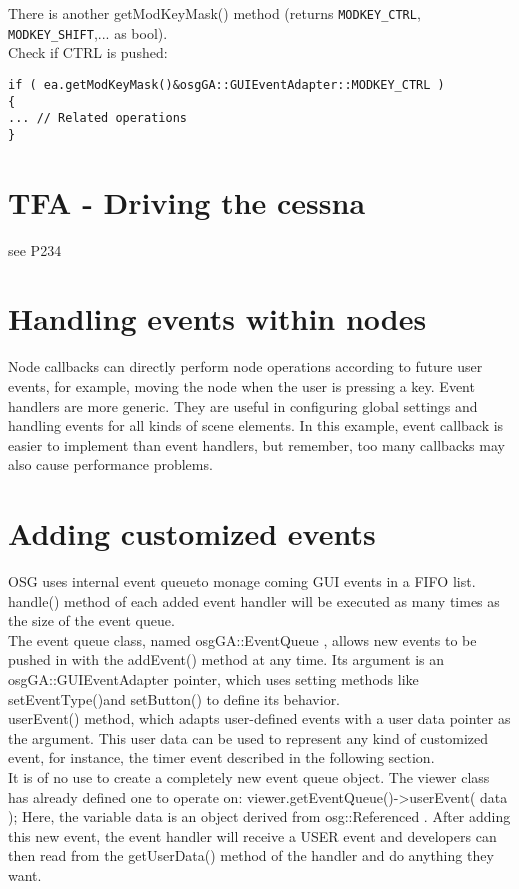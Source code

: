 \documentclass[a4paper,12pt]{book}
\begin{document}
There is another getModKeyMask() method (returns \verb|MODKEY_CTRL|, \verb|MODKEY_SHIFT|,... as bool).\\
Check if CTRL is pushed:
\begin{lstlisting}
if ( ea.getModKeyMask()&osgGA::GUIEventAdapter::MODKEY_CTRL )
{
... // Related operations
}
\end{lstlisting}

\section{TFA - Driving the cessna}
see P234

\section{Handling events within nodes}
Node callbacks can directly perform node operations according to future user events, for
example, moving the node when the user is pressing a key. Event handlers are more generic.
They are useful in configuring global settings and handling events for all kinds of scene
elements.
In this example, event callback is easier to implement than event handlers, but remember,
too many callbacks may also cause performance problems.

\section{Adding customized events}
OSG uses internal event queueto monage coming GUI events in a FIFO list.\\
handle() method of each added event handler will be executed as many times as the size of the event queue.\\
The event queue class, named osgGA::EventQueue , allows
new events to be pushed in with the addEvent() method at any time. Its argument is an osgGA::GUIEventAdapter pointer, which uses setting methods like setEventType()and setButton() to define its behavior.\\

userEvent() method, which
adapts user-defined events with a user data pointer as the argument. This user data can be
used to represent any kind of customized event, for instance, the timer event described in
the following section.\\

It is of no use to create a completely new event queue object. The viewer class has already
defined one to operate on:
viewer.getEventQueue()->userEvent( data );
Here, the variable data is an object derived from osg::Referenced . After adding this new
event, the event handler will receive a USER event and developers can then read from the
getUserData() method of the handler and do anything they want.\\
\end{document}
